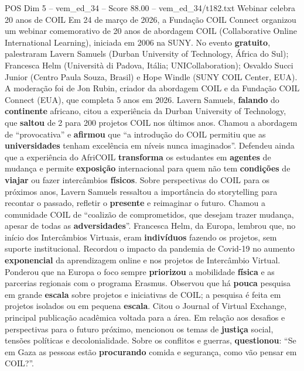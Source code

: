 \begin{textsample}{POS Dim 5 – vem\_ed\_34 – Score 88.00 – vem\_ed\_34/t182.txt}  \label{ex:f5_pos_001}
Webinar celebra 20 anos de COIL Em 24 de março de 2026, a Fundação COIL Connect organizou um webinar comemorativo de 20 anos de abordagem COIL (Collaborative Online International Learning), iniciada em 2006 na SUNY.
No evento \textbf{gratuito}, palestraram Lavern Samuels (Durban University of Technology, África do Sul); Francesca Helm (Università di Padova, Itália; UNICollaboration); Osvaldo Succi Junior (Centro Paula Souza, Brasil) e Hope Windle (SUNY COIL Center, EUA).
A moderação foi de Jon Rubin, criador da abordagem COIL e da Fundação COIL Connect (EUA), que completa 5 anos em 2026.
Lavern Samuels, \textbf{falando} do \textbf{continente} africano, citou a experiência da Durban University of Technology, que \textbf{saltou} de 2 para 200 projetos COIL nos últimos anos.
Chamou a abordagem de “provocativa” e \textbf{afirmou} que “a introdução do COIL permitiu que as \textbf{universidades} tenham excelência em níveis nunca imaginados”.
Defendeu ainda que a experiência do AfriCOIL \textbf{transforma} os estudantes em \textbf{agentes} de mudança e permite \textbf{exposição} internacional para quem não tem \textbf{condições} de \textbf{viajar} ou fazer intercâmbios \textbf{físicos}.
Sobre perspectivas do COIL para os próximos anos, Lavern Samuels ressaltou a importância do storytelling para recontar o passado, refletir o \textbf{presente} e reimaginar o futuro.
Chamou a comunidade COIL de “coalizão de comprometidos, que desejam trazer mudança, apesar de todas as \textbf{adversidades}”.
Francesca Helm, da Europa, lembrou que, no início dos Intercâmbios Virtuais, eram \textbf{indivíduos} fazendo os projetos, sem suporte institucional.
Recordou o impacto da pandemia de Covid-19 no aumento \textbf{exponencial} da aprendizagem online e nos projetos de Intercâmbio Virtual.
Ponderou que na Europa o foco sempre \textbf{priorizou} a mobilidade \textbf{física} e as parcerias regionais com o programa Erasmus.
Observou que há \textbf{pouca} pesquisa em grande \textbf{escala} sobre projetos e iniciativas de COIL; a pesquisa é feita em projetos isolados ou em pequena \textbf{escala}.
Citou o Journal of Virtual Exchange, principal publicação acadêmica voltada para a área.
Em relação aos desafios e perspectivas para o futuro próximo, mencionou os temas de \textbf{justiça} social, tensões políticas e decolonialidade.
Sobre os conflitos e guerras, \textbf{questionou}: “Se em Gaza as pessoas estão \textbf{procurando} comida e segurança, como vão pensar em COIL?”.

\end{textsample}
